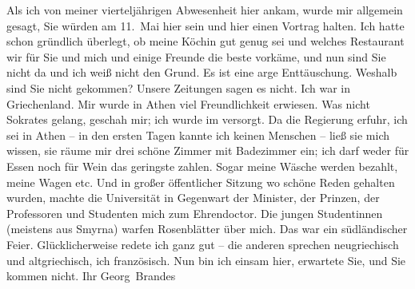 \begin{ledgroupsized}[t]{13cm}
           \pstart
           Als ich von meiner vierteljährigen Abwesenheit hier ankam, wurde mir allgemein
               gesagt, Sie würden am 11. Mai hier sein und hier einen Vortrag halten.
               Ich hatte schon gründlich überlegt, ob meine Köchin gut genug sei und welches Restaurant wir für Sie und
               mich und einige Freunde die beste vorkäme, und nun sind Sie nicht da und ich weiß
               nicht den Grund. Es ist eine arge Enttäuschung. Weshalb sind Sie nicht gekommen?
               Unsere Zeitungen sagen es nicht.\pend
           \pstart
           Ich war in Griechenland. Mir wurde in Athen viel Freundlichkeit erwiesen. Was nicht Sokrates gelang, geschah mir; ich wurde im \label{K_L02383_2v}\label{K_L02383_2h} versorgt. Da die Regierung erfuhr,
               ich sei in Athen – in den ersten Tagen kannte ich
               keinen Menschen – ließ sie mich wissen, sie räume mir drei schöne Zimmer mit
               Badezimmer ein; ich darf weder für Essen noch für Wein das geringste zahlen. Sogar
               meine Wäsche werden bezahlt, meine Wagen etc. Und in großer öffentlicher Sitzung wo
               schöne Reden gehalten wurden, machte die Universität in Gegenwart der Minister, der Prinzen, der Professoren und
               Studenten mich zum Ehrendoctor. Die jungen Studentinnen (meistens aus Smyrna) warfen Rosenblätter über mich. Das war ein
               südländischer Feier. Glücklicherweise redete ich ganz gut – die anderen
               sprechen neugriechisch und altgriechisch, ich französisch.\pend
           \pstart
           Nun bin ich einsam hier, erwartete Sie, und Sie kommen nicht.\pend
           \pstart Ihr \spacefill\mbox{Georg Brandes}\pend{}\endnumbering{}\end{ledgroupsized}  \newcommand{\dateiname}{L02383}\newcommand{\titel}{Georg Brandes an Arthur Schnitzler, 15. 5. 1922}\newcommand{\editorInnen}{Martin Anton Müller und Gerd-Hermann Susen}
            \footnotesize
\begin{ledgroupsized}[t]{11.5cm}
\end{ledgroupsized}
         
      